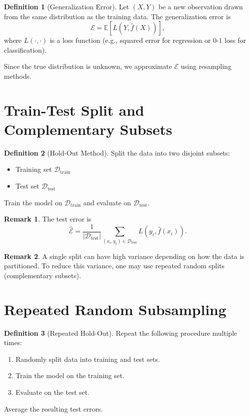 \documentclass[12pt,oneside]{book}
\numberwithin{equation}{section}
\theoremstyle{definition}
\newtheorem{definition}{Definition}[section]
\newtheorem{remark}{Remark}[section]
\theoremstyle{plain}
\theoremstyle{remark}
\newcommand{\E}{\mathbb{E}}
\begin{document}
\begin{definition}[Generalization Error]
Let $(X,Y)$ be a new observation drawn from the same distribution as the training data. The generalization error is
\[
\mathcal{E}
=
\E\left[ L(Y,\hat{f}(X)) \right],
\]
where $L(\cdot,\cdot)$ is a loss function (e.g., squared error for regression or $0$-$1$ loss for classification).
\end{definition}

Since the true distribution is unknown, we approximate $\mathcal{E}$ using resampling methods.

\section{Train-Test Split and Complementary Subsets}

\begin{definition}[Hold-Out Method]
Split the data into two disjoint subsets:
\begin{itemize}
    \item Training set $\mathcal{D}_{\text{train}}$
    \item Test set $\mathcal{D}_{\text{test}}$
\end{itemize}
Train the model on $\mathcal{D}_{\text{train}}$ and evaluate on $\mathcal{D}_{\text{test}}$.
\end{definition}

\begin{remark}
The test error is
\[
\widehat{\mathcal{E}}
=
\frac{1}{|\mathcal{D}_{\text{test}}|}
\sum_{(x_i,y_i)\in \mathcal{D}_{\text{test}}}
L(y_i,\hat{f}(x_i)).
\]
\end{remark}

\begin{remark}
A single split can have high variance depending on how the data is partitioned. To reduce this variance, one may use repeated random splits (complementary subsets).
\end{remark}

\section{Repeated Random Subsampling}

\begin{definition}[Repeated Hold-Out]
Repeat the following procedure multiple times:
\begin{enumerate}
    \item Randomly split data into training and test sets.
    \item Train the model on the training set.
    \item Evaluate on the test set.
\end{enumerate}
Average the resulting test errors.
\end{definition}
\end{document}
